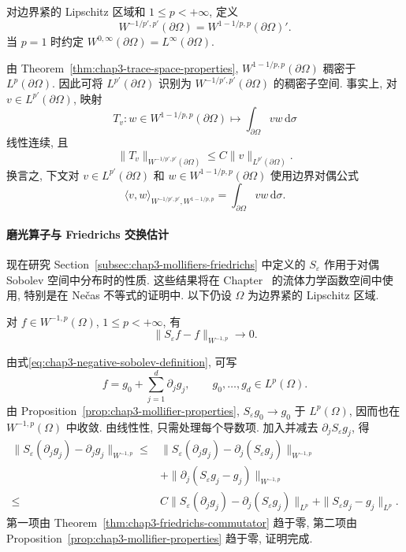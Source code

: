 \begin{Definition}
\label{def:chap3-negative-boundary-space}
对边界紧的 Lipschitz 区域和 $1\leq p<+\infty$, 定义
\[
 W^{-1/p',p'}(\partial\Omega)=W^{1-1/p,p}(\partial\Omega)'.
\]
当 $p=1$ 时约定 $W^{0,\infty}(\partial\Omega)=L^\infty(\partial\Omega)$.
\end{Definition}

由 Theorem~\ref{thm:chap3-trace-space-properties}, $W^{1-1/p,p}(\partial\Omega)$ 稠密于 $L^p(\partial\Omega)$. 因此可将 $L^{p'}(\partial\Omega)$ 识别为 $W^{-1/p',p'}(\partial\Omega)$ 的稠密子空间. 事实上, 对 $v\in L^{p'}(\partial\Omega)$, 映射
\[
 T_v:w\in W^{1-1/p,p}(\partial\Omega)
 \longmapsto\int_{\partial\Omega}vw\,\mathrm d\sigma
\]
线性连续, 且
\[
 \|T_v\|_{W^{-1/p',p'}(\partial\Omega)}
 \leq C\|v\|_{L^{p'}(\partial\Omega)}.
\]
换言之, 下文对 $v\in L^{p'}(\partial\Omega)$ 和 $w\in W^{1-1/p,p}(\partial\Omega)$ 使用边界对偶公式
\[
 \langle v,w\rangle_{W^{-1/p',p'},W^{1-1/p,p}}
 =\int_{\partial\Omega}vw\,\mathrm d\sigma.
\]

\paragraph{磨光算子与 Friedrichs 交换估计}

现在研究 Section~\ref{subsec:chap3-mollifiers-friedrichs} 中定义的 $S_\varepsilon$ 作用于对偶 Sobolev 空间中分布时的性质. 这些结果将在 Chapter~ 的流体力学函数空间中使用, 特别是在 Ne\v{c}as 不等式的证明中. 以下仍设 $\Omega$ 为边界紧的 Lipschitz 区域.

\begin{Proposition}
\label{prop:chap3-negative-sobolev-mollification}
对 $f\in W^{-1,p}(\Omega)$, $1\leq p<+\infty$, 有
\[
 \|S_\varepsilon f-f\|_{W^{-1,p}}\to0.
\]
\end{Proposition}

\begin{Proof}
由式\eqref{eq:chap3-negative-sobolev-definition}, 可写
\[
 f=g_0+\sum_{j=1}^d\partial_jg_j,
 \qquad g_0,\ldots,g_d\in L^p(\Omega).
\]
由 Proposition~\ref{prop:chap3-mollifier-properties}, $S_\varepsilon g_0\to g_0$ 于 $L^p(\Omega)$, 因而也在 $W^{-1,p}(\Omega)$ 中收敛. 由线性性, 只需处理每个导数项. 加入并减去 $\partial_jS_\varepsilon g_j$, 得
\begin{align*}
 \|S_\varepsilon(\partial_jg_j)-\partial_jg_j\|_{W^{-1,p}}
 \leq{}&\|S_\varepsilon(\partial_jg_j)-\partial_j(S_\varepsilon g_j)\|_{W^{-1,p}}\\
 &+\|\partial_j(S_\varepsilon g_j-g_j)\|_{W^{-1,p}}\\
 \leq{}&C\|S_\varepsilon(\partial_jg_j)-\partial_j(S_\varepsilon g_j)\|_{L^p}
 +\|S_\varepsilon g_j-g_j\|_{L^p}.
\end{align*}
第一项由 Theorem~\ref{thm:chap3-friedrichs-commutator} 趋于零, 第二项由 Proposition~\ref{prop:chap3-mollifier-properties} 趋于零, 证明完成.
\end{Proof}

